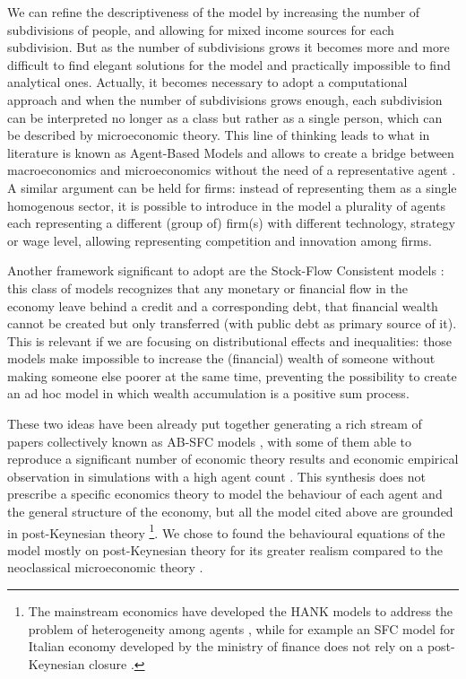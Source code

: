 \documentclass[]{article}
\begin{document}
We can refine the descriptiveness of the model by increasing the number of subdivisions of people, and allowing for mixed income sources for each subdivision.
But as the number of subdivisions grows it becomes more and more difficult to find elegant solutions for the model and practically impossible to find analytical ones.
Actually, it becomes necessary to adopt a computational approach \parencite{tesfatsion2006a} and when the number of subdivisions grows enough, each subdivision can be interpreted no longer as a class but rather as a single person, which can be described by microeconomic theory.
This line of thinking leads to what in literature is known as Agent-Based Models \parencite{arthur2021, farmer2012} and allows to create a bridge between macroeconomics and microeconomics without the need of a representative agent \parencite{dosi2019}.
A similar argument can be held for firms: instead of representing them as a single homogenous sector, it is possible to introduce in the model a plurality of agents each representing a different (group of) firm(s) with different technology, strategy or wage level, allowing representing competition and innovation among firms.

Another framework significant to adopt are the Stock-Flow Consistent models \parencite{nikiforos2017,godley2012}: this class of models recognizes that any monetary or financial flow in the economy leave behind a credit and a corresponding debt, that financial wealth cannot be created but only transferred (with public debt as primary source of it).
This is relevant if we are focusing on distributional effects and inequalities: those models make impossible to increase the (financial) wealth of someone without making someone else poorer at the same time, preventing the possibility to create an ad hoc model in which wealth accumulation is a positive sum process.

These two ideas have been already put together generating a rich stream of papers collectively known as AB-SFC models \parencite{caverzasi2018}, with some of them able to reproduce a significant number of economic theory results and economic empirical observation in simulations with a high agent count \parencite[e.g.][]{caiani2016,reissl2024,dawid2019,dosi2010}.
This synthesis does not prescribe a specific economics theory to model the behaviour of each agent and the general structure of the economy, but all the model cited above are grounded in post-Keynesian theory \parencite{lavoie2022}\footnote{The mainstream economics have developed the HANK models to address the problem of heterogeneity among agents \parencite{violante2021}, while for example an SFC model for Italian economy developed by the ministry of finance does not rely on a post-Keynesian closure \parencite{barbierihermitte2023}.}.
We chose to found the behavioural equations of the model mostly on post-Keynesian theory for its greater realism compared to the neoclassical microeconomic theory \parencite{kirman1992,arnsperger2006}.
\end{document}
